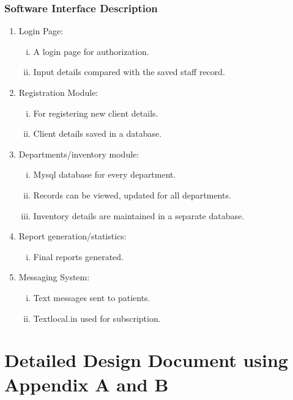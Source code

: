 \documentclass[oneside,a4paper,12pt]{book}
\begin{document}
 \subsection{Software Interface Description}	
 \begin{enumerate}[1.]
\item Login Page:
\begin{enumerate}[(i)]
\item A login page for authorization.
\item Input details compared with the saved staff record.
\end{enumerate}

\item Registration Module:
\begin{enumerate}[(i)]
\item For registering new client details.
\item Client details saved in a database.
\end{enumerate}

\item Departments/inventory module:
\begin{enumerate}[(i)]
\item Mysql database for every department.
\item Records can be viewed, updated for all departments.
\item Inventory details are maintained in a separate database.
\end{enumerate}

\item Report generation/statistics:
\begin{enumerate}[(i)]
\item Final reports generated.
\end{enumerate}

\item Messaging System:
\begin{enumerate}[(i)]
\item Text messages sent to patients.
\item Textlocal.in used for subscription.
\end{enumerate}


\end{enumerate}  





\chapter{Detailed Design Document using Appendix A and B}
\end{document}
